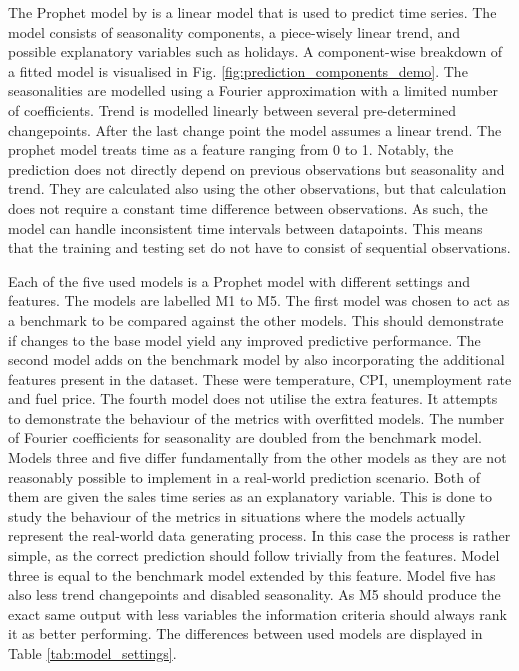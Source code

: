 \documentclass[english, 12pt, a4paper, sci, utf8, a-1b, online]{aaltothesis}
\begin{document}
\begin{abstractpage}[english]
The Prophet model by \cite{Prophet} is a linear model that is used to predict time series. The model consists of seasonality components, a piece-wisely linear trend, and possible explanatory variables such as holidays. A component-wise breakdown of a fitted model is visualised in Fig. \ref{fig:prediction_components_demo}. The seasonalities are modelled using a Fourier approximation with a limited number of coefficients. Trend is modelled linearly between several pre-determined changepoints. After the last change point the model assumes a linear trend. The prophet model treats time as a feature ranging from 0 to 1. Notably, the prediction does not directly depend on previous observations but seasonality and trend. They are calculated also using the other observations, but that calculation does not require a constant time difference between observations. As such, the model can handle inconsistent time intervals between datapoints. This means that the training and testing set do not have to consist of sequential observations.


Each of the five used models is a Prophet model with different settings and features. The models are labelled M1 to M5. The first model was chosen to act as a benchmark to be compared against the other models. This should demonstrate if changes to the base model yield any improved predictive performance. The second model adds on the benchmark model by also incorporating the additional features present in the dataset. These were temperature, CPI, unemployment rate and fuel price. The fourth model does not utilise the extra features. It attempts to demonstrate the behaviour of the metrics with overfitted models. The number of Fourier coefficients for seasonality are doubled from the benchmark model. Models three and five differ fundamentally from the other models as they are not reasonably possible to implement in a real-world prediction scenario. Both of them are given the sales time series as an explanatory variable. This is done to study the behaviour of the metrics in situations where the models actually represent the real-world data generating process. In this case the process is rather simple, as the correct prediction should follow trivially from the features. Model three is equal to the benchmark model extended by this feature. Model five has also less trend changepoints and disabled seasonality. As M5 should produce the exact same output with less variables the information criteria should always rank it as better performing. The differences between used models are displayed in Table \ref{tab:model_settings}.


\end{abstractpage}
\end{document}
